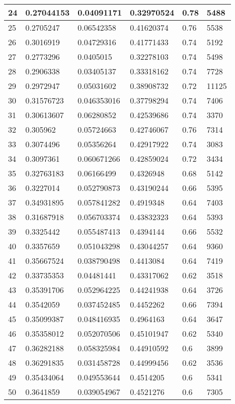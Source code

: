 \begin{longtable}{|l|l|l|l|l|l|}
24 & 0.27044153 & 0.04091171 & 0.32970524 & 0.78 & 5488 \\ \hline 
25 & 0.2705247 & 0.06542358 & 0.41620374 & 0.76 & 5538 \\ \hline 
26 & 0.3016919 & 0.04729316 & 0.41771433 & 0.74 & 5192 \\ \hline 
27 & 0.2773296 & 0.0405015 & 0.32278103 & 0.74 & 5498 \\ \hline 
28 & 0.2906338 & 0.03405137 & 0.33318162 & 0.74 & 7728 \\ \hline 
29 & 0.2972947 & 0.05031602 & 0.38908732 & 0.72 & 11125 \\ \hline 
30 & 0.31576723 & 0.046353016 & 0.37798294 & 0.74 & 7406 \\ \hline 
31 & 0.30613607 & 0.06280852 & 0.42539686 & 0.74 & 3370 \\ \hline 
32 & 0.305962 & 0.05724663 & 0.42746067 & 0.76 & 7314 \\ \hline 
33 & 0.3074496 & 0.05356264 & 0.42917922 & 0.74 & 3083 \\ \hline 
34 & 0.3097361 & 0.060671266 & 0.42859024 & 0.72 & 3434 \\ \hline 
35 & 0.32763183 & 0.06166499 & 0.4326948 & 0.68 & 5142 \\ \hline 
36 & 0.3227014 & 0.052790873 & 0.43190244 & 0.66 & 5395 \\ \hline 
37 & 0.34931895 & 0.057841282 & 0.4919348 & 0.64 & 7403 \\ \hline 
38 & 0.31687918 & 0.056703374 & 0.43832323 & 0.64 & 5393 \\ \hline 
39 & 0.3325442 & 0.055487413 & 0.4394144 & 0.66 & 5532 \\ \hline 
40 & 0.3357659 & 0.051043298 & 0.43044257 & 0.64 & 9360 \\ \hline 
41 & 0.35667524 & 0.038790498 & 0.4413084 & 0.64 & 7419 \\ \hline 
42 & 0.33735353 & 0.04481441 & 0.43317062 & 0.62 & 3518 \\ \hline 
43 & 0.35391706 & 0.052964225 & 0.44241938 & 0.64 & 3726 \\ \hline 
44 & 0.3542059 & 0.037452485 & 0.4452262 & 0.66 & 7394 \\ \hline 
45 & 0.35099387 & 0.048416935 & 0.4964163 & 0.64 & 3647 \\ \hline 
46 & 0.35358012 & 0.052070506 & 0.45101947 & 0.62 & 5340 \\ \hline 
47 & 0.36282188 & 0.058325984 & 0.44910592 & 0.6 & 3899 \\ \hline 
48 & 0.36291835 & 0.031458728 & 0.44999456 & 0.62 & 3536 \\ \hline 
49 & 0.35434064 & 0.049553644 & 0.4514205 & 0.6 & 5341 \\ \hline 
50 & 0.3641859 & 0.039054967 & 0.4521276 & 0.6 & 7305 \\ \hline 
\end{longtable}
